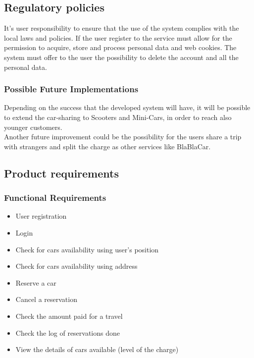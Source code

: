\subsection{Regulatory policies}
It’s user responsibility to ensure that the use of the system complies with the local laws and policies. If the user register to the service must allow for the permission to acquire, store and process personal data and web cookies. The system must offer to the user the possibility to delete the account and all the personal data.


\subsubsection{Possible Future Implementations}
Depending on the success that the developed system will have, it will be possible to extend the car-sharing to Scooters and Mini-Cars, in order to reach also younger customers.
\noindent 
\\Another future improvement could be the possibility for the users share a trip with strangers and split the charge as other services like BlaBlaCar. 
\pagebreak{}

\subsection{Product requirements}
\subsubsection{Functional Requirements}

\begin{itemize}
	\item User registration
	\item Login
	\item Check for cars availability using user's position
	\item Check for cars availability using address
	\item Reserve a car
	\item Cancel a reservation
	\item Check the amount paid for a travel
	\item Check the log of reservations done
	\item View the details of cars available (level of the charge)
	
	
\end{itemize}



